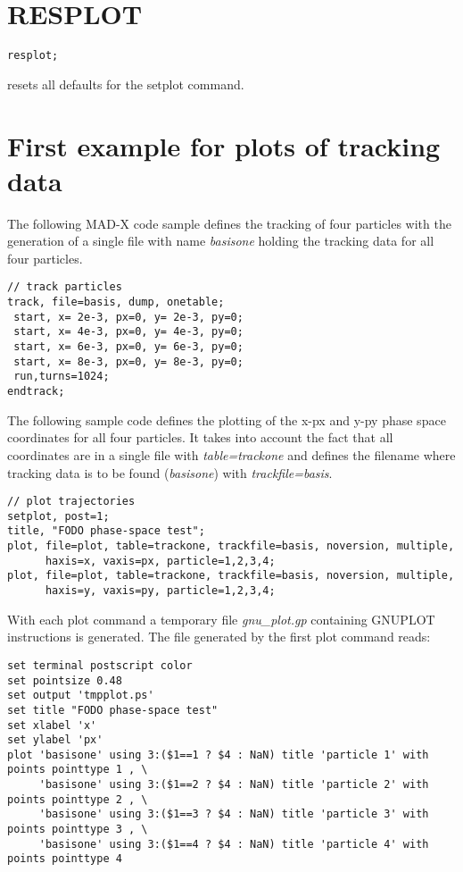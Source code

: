 \section{RESPLOT}
\begin{verbatim}
resplot; 
\end{verbatim} 
resets all defaults for the setplot command.  


\section{First example for plots of tracking data}

The following MAD-X code sample defines the tracking of four particles 
with the generation of a single file with name \textit{basisone} 
holding the tracking data for all four particles.  

\begin{verbatim}
// track particles
track, file=basis, dump, onetable;
 start, x= 2e-3, px=0, y= 2e-3, py=0;
 start, x= 4e-3, px=0, y= 4e-3, py=0;
 start, x= 6e-3, px=0, y= 6e-3, py=0;
 start, x= 8e-3, px=0, y= 8e-3, py=0;
 run,turns=1024;
endtrack;
\end{verbatim}

The following sample code defines the plotting of the x-px and y-py
phase space coordinates for all four particles. 
It takes into account the fact that all coordinates are in a single file 
with \textit{table=trackone} and defines the filename where tracking data 
is to be found (\textit{basisone}) with \textit{trackfile=basis}. 

\begin{verbatim}
// plot trajectories
setplot, post=1; 
title, "FODO phase-space test";
plot, file=plot, table=trackone, trackfile=basis, noversion, multiple, 
      haxis=x, vaxis=px, particle=1,2,3,4; 
plot, file=plot, table=trackone, trackfile=basis, noversion, multiple, 
      haxis=y, vaxis=py, particle=1,2,3,4;
\end{verbatim}

With each plot command a temporary file \textit{gnu\_plot.gp} containing
GNUPLOT instructions is generated.  
The file generated by the first plot command reads: 

{\footnotesize \begin{verbatim}  
set terminal postscript color
set pointsize 0.48
set output 'tmpplot.ps'
set title "FODO phase-space test"
set xlabel 'x'
set ylabel 'px'
plot 'basisone' using 3:($1==1 ? $4 : NaN) title 'particle 1' with points pointtype 1 , \
     'basisone' using 3:($1==2 ? $4 : NaN) title 'particle 2' with points pointtype 2 , \
     'basisone' using 3:($1==3 ? $4 : NaN) title 'particle 3' with points pointtype 3 , \
     'basisone' using 3:($1==4 ? $4 : NaN) title 'particle 4' with points pointtype 4 
\end{verbatim}}

